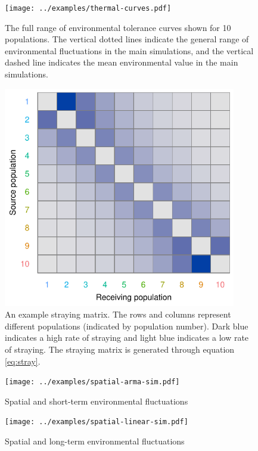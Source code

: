\clearpage

\begin{figure}[htbp]
\centering
\texttt{[image: ../examples/thermal-curves.pdf]}
\caption{The full range of environmental tolerance curves shown for 10 
populations. The vertical dotted lines indicate the general range of 
environmental fluctuations in the main simulations, and the vertical dashed 
line indicates the mean environmental value in the main simulations.}
\label{f:all-curves}
\end{figure}

\clearpage

\begin{figure}[htbp]
\centering
\includegraphics[width=4.0in]{../examples/figure/stray-matrix.pdf}
\caption{An example straying matrix. The rows and columns represent different 
populations (indicated by population number). Dark blue indicates a high rate 
of straying and light blue indicates a low rate of straying. The straying 
matrix is generated through equation \ref{eq:stray}.}
\label{f:stray}
\end{figure}

\clearpage

\begin{figure}[htbp]
\centering
\texttt{[image: ../examples/spatial-arma-sim.pdf]}
\caption{Spatial and short-term environmental fluctuations}
\label{f:eg-sp-arma}
\end{figure}

\clearpage

\begin{figure}[htbp]
\centering
\texttt{[image: ../examples/spatial-linear-sim.pdf]}
\caption{Spatial and long-term environmental fluctuations}
\label{f:eg-sp-linear}
\end{figure}

